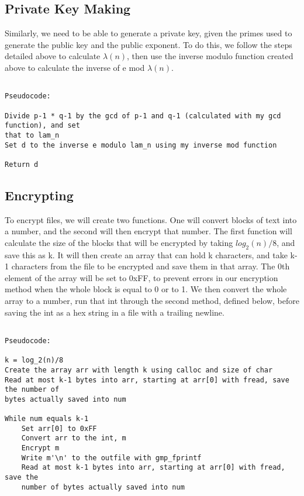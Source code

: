 \documentclass[11pt]{article}
\begin{document}
\subsection{Private Key Making}

Similarly, we need to be able to generate a private key, given the primes used to generate the public key and the public exponent. To do this, we follow the steps detailed above to calculate $\lambda(n)$, then use the inverse modulo function created above to calculate the inverse of e mod $\lambda(n)$.

\begin{verbatim}

Pseudocode:

Divide p-1 * q-1 by the gcd of p-1 and q-1 (calculated with my gcd function), and set
that to lam_n
Set d to the inverse e modulo lam_n using my inverse mod function

Return d

\end{verbatim}

\subsection{Encrypting}

To encrypt files, we will create two functions. One will convert blocks of text into a number, and the second will then encrypt that number. The first function will calculate the size of the blocks that will be encrypted by taking $log_2(n)/8$, and save this as k. It will then create an array that can hold k characters, and take k-1 characters from the file to be encrypted and save them in that array. The 0th element of the array will be set to 0xFF, to prevent errors in our encryption method when the whole block is equal to 0 or to 1. We then convert the whole array to a number, run that int through the second method, defined below, before saving the int as a hex string in a file with a trailing newline.

\begin{verbatim}

Pseudocode:

k = log_2(n)/8
Create the array arr with length k using calloc and size of char
Read at most k-1 bytes into arr, starting at arr[0] with fread, save the number of
bytes actually saved into num

While num equals k-1
    Set arr[0] to 0xFF
    Convert arr to the int, m
    Encrypt m
    Write m'\n' to the outfile with gmp_fprintf
    Read at most k-1 bytes into arr, starting at arr[0] with fread, save the
    number of bytes actually saved into num

\end{verbatim}
\end{document}
